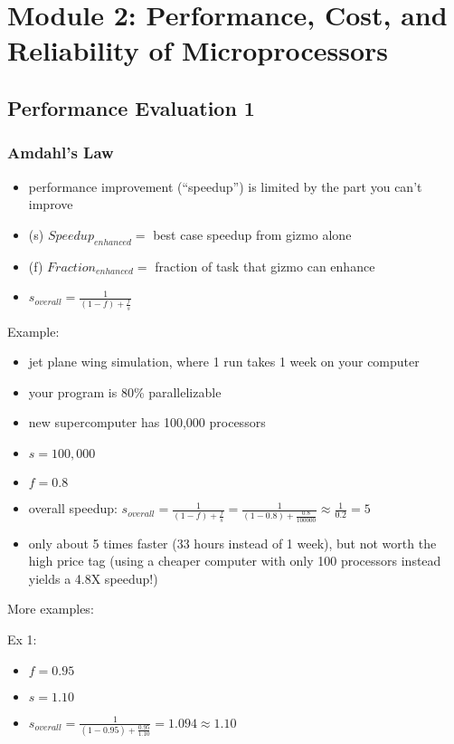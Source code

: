 \documentclass[12pt]{extarticle}
\begin{document}
	\section{Module 2: Performance, Cost, and Reliability of Microprocessors}

	\subsection{Performance Evaluation 1}

	\subsubsection{Amdahl's Law}

	\begin{itemize}
		\item performance improvement (``speedup'') is limited by the part you can't improve
		\item (s) $Speedup_{enhanced} =$ best case speedup from gizmo alone
		\item (f) $Fraction_{enhanced} =$ fraction of task that gizmo can enhance
		\item $s_{overall} = \frac{1}{(1 - f) + \frac{f}{s}}$
	\end{itemize}

	Example:

	\begin{itemize}
		\item jet plane wing simulation, where 1 run takes 1 week on your computer
		\item your program is 80\% parallelizable
		\item new supercomputer has 100,000 processors
		\item $s = 100,000$
		\item $f = 0.8$
		\item overall speedup: $s_{overall} = \frac{1}{(1 - f) + \frac{f}{s}} = \frac{1}{(1 - 0.8) + \frac{0.8}{100000}} \approx \frac{1}{0.2} = 5$
		\item only about 5 times faster (33 hours instead of 1 week), but not worth the high price tag (using a cheaper computer with only 100 processors instead yields a 4.8X speedup!)
	\end{itemize}

	More examples:

	Ex 1:

	\begin{itemize}
		\item $f = 0.95$
		\item $s = 1.10$
		\item $s_{overall} = \frac{1}{(1-0.95) + \frac{0.95}{1.10}} = 1.094 \approx 1.10$
	\end{itemize}
\end{document}
